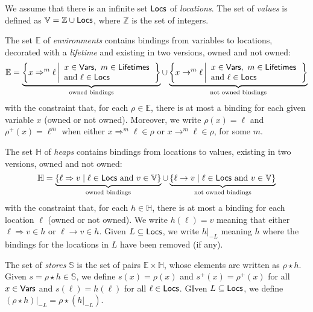 \begin{definition}
  We assume that there is an infinite set $\mathsf{Locs}$ of \emph{locations}.
  The set of \emph{values} is defined as $\mathbb{V}=\mathbb{Z}\cup\mathsf{Locs}$,
  where $\mathbb{Z}$ is the set of integers.

  The set $\mathbb{E}$
  of \emph{environments} contains bindings from variables to locations,
  decorated with a \emph{lifetime} and existing in two versions, owned
  and not owned:
  \[
  \mathbb{E}=
  \underbrace{\left\{x\Rightarrow^m\ell\left|\begin{array}{l}
  x\in\mathsf{Vars},\ m\in\mathsf{Lifetimes}\\
  \text{and }\ell\in\mathsf{Locs}
  \end{array}\right.\right\}}_{\text{owned bindings}}
  \cup
  \underbrace{\left\{x\rightarrow^m\ell\left|\begin{array}{l}
  x\in\mathsf{Vars},\ m\in\mathsf{Lifetimes}\\
  \text{and }\ell\in\mathsf{Locs}
  \end{array}\right.\right\}}_{\text{not owned bindings}}
  \]
  with the constraint that, for each $\rho\in\mathbb{E}$, there is at most a binding for each
  given variable $x$ (owned or not owned). Moreover, we write $\rho(x)=\ell$ and
  $\rho^+(x)=\ell^m$ when
  either $x\Rightarrow^m\ell\in\rho$ or $x\rightarrow^m\ell\in\rho$, for some $m$.

  The set $\mathbb{H}$ of \emph{heaps} contains bindings from locations to values,
  existing in two versions, owned and not owned:
  \[
  \mathbb{H}=
  \underbrace{\{\ell\Rightarrow v\mid\ell\in\mathsf{Locs}\text{ and }v\in\mathbb{V}\}}_{\text{owned bindings}}
  \cup
  \underbrace{\{\ell\rightarrow v\mid\ell\in\mathsf{Locs}\text{ and }v\in\mathbb{V}\}}_{\text{not owned bindings}}
  \]
  with the constraint that, for each $h\in\mathbb{H}$, there is at most a binding for each
  location $\ell$ (owned or not owned). We write $h(\ell)=v$ meaning that
  either $\ell\Rightarrow v\in h$ or $\ell\rightarrow v\in h$. Given $L\subseteq\mathsf{Locs}$,
  we write $h|_{-L}$ meaning $h$ where the bindings for the locations in $L$
  have been removed (if any).

  The set of \emph{stores} $\mathbb{S}$ is the set of pairs
  $\mathbb{E}\times\mathbb{H}$, whose elements are written as $\rho\star h$.
  Given $s=\rho\star h\in\mathbb{S}$, we define $s(x)=\rho(x)$
  and $s^+(x)=\rho^+(x)$ for all
  $x\in\mathsf{Vars}$ and $s(\ell)=h(\ell)$ for all $\ell\in\mathsf{Locs}$.
  GIven $L\subseteq\mathsf{Locs}$, we define $(\rho\star h)|_{-L}=\rho\star(h|_{-L})$.
\end{definition}

